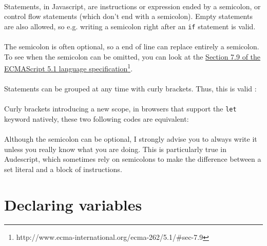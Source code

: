 \documentclass{article}
\begin{document}
\begin{sloppypar}
\paragraph{}
Statements, in Javascript, are instructions or expression ended by a semicolon, or control flow statements (which don't end with a semicolon). Empty statements are also allowed, so e.g. writing a semicolon right after an \verb!if! statement is valid.
   
   
\paragraph{}
The semicolon is often optional, so a end of line can replace entirely a semicolon. To see when the semicolon can be omitted, you can look at the \href{http://www.ecma-international.org/ecma-262/5.1/#sec-7.9}{Section 7.9 of the ECMAScript 5.1 language specification}\footnote{http://www.ecma-international.org/ecma-262/5.1/\#sec-7.9}.

   
\paragraph{}
Statements can be grouped at any time with curly brackets. Thus, this is valid :
   {}

   
\paragraph{}
Curly brackets introducing a new scope, in browsers that support the \verb!let! keyword natively, these two following codes are equivalent:

   {}

   {}

   
\paragraph{}
Although the semicolon can be optional, I strongly advise you to always write it unless you really know what you are doing. This is particularly true in Audescript, which sometimes rely on semicolons to make the difference between a set literal and a block of instructions.




\section{ Declaring variables}




\end{sloppypar}
\end{document}
